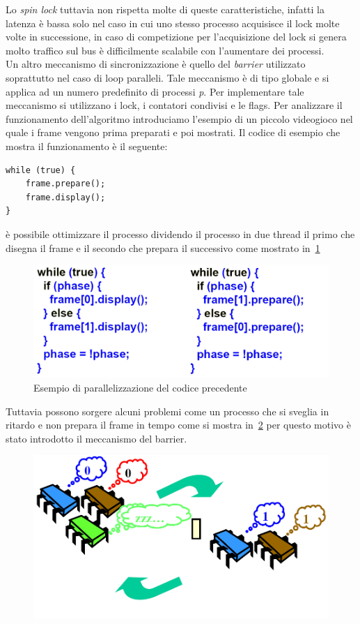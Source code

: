 Lo \emph{spin lock} tuttavia non rispetta molte di queste caratteristiche, infatti la latenza è bassa solo nel caso in cui uno stesso processo acquisisce il lock molte volte in successione, in caso di competizione per l'acquisizione del lock si genera molto traffico sul bus è difficilmente scalabile con l'aumentare dei processi.\\
Un altro meccanismo di sincronizzazione è quello del \emph{barrier} utilizzato soprattutto nel caso di loop paralleli. Tale meccanismo è di tipo globale e si applica ad un numero predefinito di processi \emph{p}. Per implementare tale meccanismo si utilizzano i lock, i contatori condivisi e le flags.
Per analizzare il funzionamento dell'algoritmo introduciamo l'esempio di un piccolo videogioco nel quale i frame vengono prima preparati e poi mostrati. Il codice di esempio che mostra il funzionamento è il seguente:
\begin{verbatim}
while (true) {
    frame.prepare();
    frame.display();
}
\end{verbatim}
è possibile ottimizzare il processo dividendo il processo in due thread il primo che disegna il frame e il secondo che prepara il successivo come mostrato in \figurename\,\ref{fig:barrierexemp}
\begin{figure}[htb]
\centering
\includegraphics[scale=0.4]{img/barrierexemp.png}
\caption{Esempio di parallelizzazione del codice precedente}\label{fig:barrierexemp}
\end{figure}
Tuttavia possono sorgere alcuni problemi come un processo che si sveglia in ritardo e non prepara il frame in tempo come si mostra in \figurename\,\ref{fig:barrierfail} per questo motivo è stato introdotto il meccanismo del barrier.
\begin{figure}[htb]
\centering
\includegraphics[scale=0.5]{img/barrierfail.png}
\caption{}\label{fig:barrierfail}
\end{figure}

